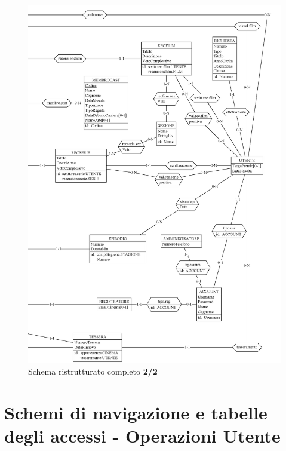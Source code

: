 \documentclass[a4paper,12pt]{report}
\begin{document}
	\begin{figure}[H]
		\centering
		\includegraphics[width=450pt]{ER/ristrutturazione/ristcomp2.png}
		\caption{Schema ristrutturato completo \textbf{2/2}}
	\end{figure}
	
	\section{Schemi di navigazione e tabelle degli accessi - Operazioni Utente}
\end{document}
